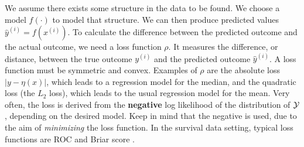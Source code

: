 We assume there exists some structure in the data to be found. We choose a model $f(\cdot)$ to model that structure. We can then produce predicted values $\hat{y}^{(i)}=f(x^{(i)})$. To calculate the difference between the predicted outcome and the actual outcome, we need a loss function $\rho$. It measures the difference, or distance, between the true outcome $y^{(i)}$ and the predicted outcome $\hat{y}^{(i)}$. A loss function must be symmetric and convex. Examples of $\rho$ are the absolute loss $|y-\eta(x)|$, which leads to a regression model for the median, and the quadratic loss (the $L_2$ loss), which leads to the usual regression model for the mean. Very often, the loss is derived from the \textbf{negative} log likelihood of the distribution of $\mathcal{Y}$, depending on the desired model. Keep in mind that the negative is used, due to the aim of \textit{minimizing} the loss function. In the survival data setting, typical loss functions are ROC and Briar score \citep{bovelstadborgan}.

